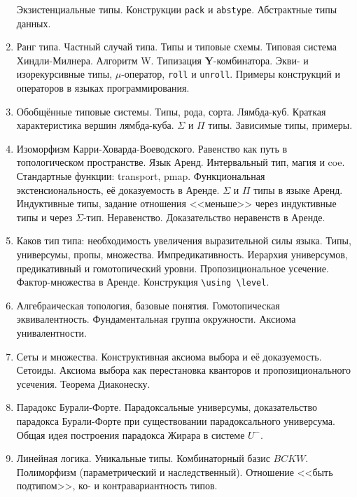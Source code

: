 \documentclass[11pt,a4paper,oneside]{article}
\begin{document}
\begin{enumerate}
Экзистенциальные типы. Конструкции \texttt{pack} и \texttt{abstype}. Абстрактные типы данных. 
\item Ранг типа. Частный случай типа. Типы и типовые схемы. Типовая система Хиндли-Милнера. Алгоритм W.
Типизация \textbf{Y}-комбинатора. Экви- и изорекурсивные типы, $\mu$-оператор, \texttt{roll} и \texttt{unroll}.
Примеры конструкций и операторов в языках программирования.
\item Обобщённые типовые системы. Типы, рода, сорта. Лямбда-куб. Краткая характеристика вершин лямбда-куба. 
$\Sigma$ и $\Pi$ типы. Зависимые типы, примеры.
\item Изоморфизм Карри-Ховарда-Воеводского.
Равенство как путь в топологическом пространстве. Язык Аренд. Интервальный тип, магия и coe. 
Стандартные функции: transport, pmap. 
Функциональная экстенсиональность, её доказуемость в Аренде. $\Sigma$ и $\Pi$ типы в языке Аренд. 
Индуктивные типы, задание отношения <<меньше>> через индуктивные типы и через $\Sigma$-тип. 
Неравенство. Доказательство неравенств в Аренде.
\item Каков тип типа: необходимость увеличения выразительной силы языка.
Типы, универсумы, пропы, множества. Импредикативность. Иерархия универсумов, предикативный и гомотопический 
уровни. Пропозициональное усечение. Фактор-множества в Аренде. Конструкция \verb!\using \level!. 
\item Алгебраическая топология, базовые понятия. Гомотопическая эквивалентность. Фундаментальная группа окружности. 
Аксиома унивалентности.
\item Сеты и множества. Конструктивная аксиома выбора и её доказуемость. 
Сетоиды. Аксиома выбора как перестановка кванторов и пропозиционального усечения. 
Теорема Диаконеску. 
\item Парадокс Бурали-Форте. Парадоксальные универсумы, доказательство парадокса Бу\-ра\-ли-Форте при 
существовании парадоксального универсума. Общая идея построения парадокса Жирара в системе $U^-$.
\item Линейная логика. Уникальные типы. Комбинаторный базис $BCKW$. Полиморфизм (параметрический и наследственный).
Отношение <<быть подтипом>>, ко- и контравариантность типов.
\end{enumerate}
\end{document}
